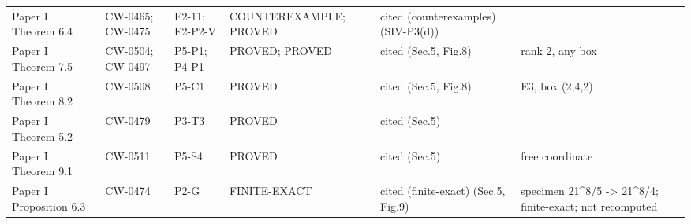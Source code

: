 {\begin{longtable}{@{}p{2.9cm}p{1.5cm}p{1.2cm}p{3.1cm}p{3.1cm}p{2.2cm}@{}}
Paper I Theorem 6.4 & CW-0465; CW-0475 & E2-11; E2-P2-V & COUNTEREXAMPLE; PROVED & cited (counterexamples) (SIV-P3(d)) & \\
Paper I Theorem 7.5 & CW-0504; CW-0497 & P5-P1; P4-P1 & PROVED; PROVED & cited (Sec.5, Fig.8) & rank 2, any box\\
Paper I Theorem 8.2 & CW-0508 & P5-C1 & PROVED & cited (Sec.5, Fig.8) & E3, box (2,4,2)\\
Paper I Theorem 5.2 & CW-0479 & P3-T3 & PROVED & cited (Sec.5) & \\
Paper I Theorem 9.1 & CW-0511 & P5-S4 & PROVED & cited (Sec.5) & free coordinate\\
Paper I Proposition 6.3 & CW-0474 & P2-G & FINITE-EXACT & cited (finite-exact) (Sec.5, Fig.9) & specimen 21\^{}8/5 -> 21\^{}8/4; finite-exact; not recomputed\\
\bottomrule\end{longtable}}
